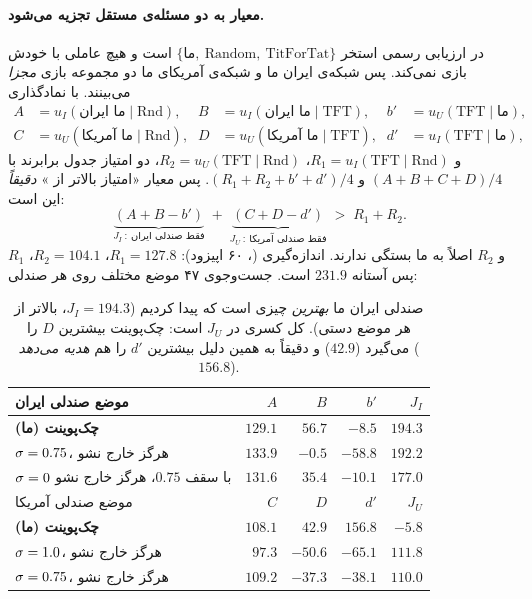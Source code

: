 \documentclass[12pt,a4paper]{article}
\begin{document}
\paragraph{معیار به دو مسئله‌ی مستقل تجزیه می‌شود.}
در ارزیابی رسمی استخر $\{\text{ما},\ \mathrm{Random},\ \mathrm{TitForTat}\}$ است و
هیچ عاملی با خودش بازی نمی‌کند. پس شبکه‌ی ایران ما و شبکه‌ی آمریکای ما
دو مجموعه بازی \emph{مجزا} می‌بینند. با نمادگذاری
\[
\begin{aligned}
A&=u_I(\text{ما ایران}\mid \mathrm{Rnd}), &\quad
B&=u_I(\text{ما ایران}\mid \mathrm{TFT}), &\quad
b'&=u_U(\mathrm{TFT}\mid \text{ما}),\\
C&=u_U(\text{ما آمریکا}\mid \mathrm{Rnd}), &\quad
D&=u_U(\text{ما آمریکا}\mid \mathrm{TFT}), &\quad
d'&=u_I(\mathrm{TFT}\mid \text{ما}),
\end{aligned}
\]
و $R_1=u_I(\mathrm{TFT}\mid\mathrm{Rnd})$، $R_2=u_U(\mathrm{TFT}\mid\mathrm{Rnd})$،
دو امتیاز جدول برابرند با $(A{+}B{+}C{+}D)/4$ و
$(R_1{+}R_2{+}b'{+}d')/4$. پس معیار «امتیاز بالاتر از »
\emph{دقیقاً} این است:
\begin{equation}\label{eq:crit}
  \underbrace{(A+B-b')}_{J_I\ :\ \text{فقط صندلی ایران}}
  \;+\;
  \underbrace{(C+D-d')}_{J_U\ :\ \text{فقط صندلی آمریکا}}
  \;>\; R_1+R_2 .
\end{equation}
$R_1$ و $R_2$ اصلاً به ما بستگی ندارند. اندازه‌گیری
(، ۶۰ اپیزود): $R_1=127.8$، $R_2=104.1$، پس آستانه
$231.9$ است. جست‌وجوی ۴۷ موضع مختلف روی هر صندلی:

\begin{table}[h]\centering\small
\begin{tabular}{lrrrr}
\toprule
موضع صندلی ایران & $A$ & $B$ & $b'$ & $J_I$\\
\midrule
\textbf{چک‌پوینت (ما)} & $129.1$ & $56.7$ & $-8.5$ & $\mathbf{194.3}$\\
$\sigma=0.75$، هرگز خارج نشو & $133.9$ & $-0.5$ & $-58.8$ & $192.2$\\
$\sigma=0$ با سقف $0.75$، هرگز خارج نشو & $131.6$ & $35.4$ & $-10.1$ & $177.0$\\
\midrule
موضع صندلی آمریکا & $C$ & $D$ & $d'$ & $J_U$\\
\midrule
\textbf{چک‌پوینت (ما)} & $108.1$ & $\mathbf{42.9}$ & $\mathbf{156.8}$ & $\mathbf{-5.8}$\\
$\sigma=1.0$، هرگز خارج نشو & $97.3$ & $-50.6$ & $-65.1$ & $111.8$\\
$\sigma=0.75$، هرگز خارج نشو & $109.2$ & $-37.3$ & $-38.1$ & $110.0$\\
\bottomrule
\end{tabular}
\caption{صندلی ایران ما \emph{بهترین} چیزی است که پیدا کردیم
($J_I=194.3$، بالاتر از هر موضع دستی). کل کسری در $J_U$ است: چک‌پوینت
بیشترین $D$ را می‌گیرد ($42.9$) و دقیقاً به همین دلیل بیشترین $d'$ را هم
\emph{هدیه می‌دهد} ($156.8$).}
\end{table}
\end{document}
